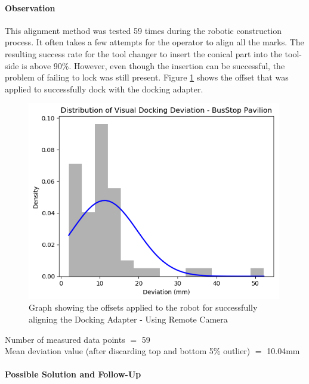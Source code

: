 \paragraph{Observation}

This alignment method was tested 59 times during the robotic construction process.  It often takes a few attempts for the operator to align all the marks. The resulting success rate for the tool changer to insert the conical part into the tool-side is above 90\%. However, even though the insertion can be successful, the problem of failing to lock was still present. Figure \ref{fig:remote-camera-offset} shows the offset that was applied to successfully dock with the docking adapter.

\begin{figure}[!h]
    \centering
    \includegraphics[width=0.99\textwidth]{images/6b/img12.png}
    \caption{Graph showing the offsets applied to the robot for successfully aligning the Docking Adapter - Using Remote Camera}
    \label{fig:remote-camera-offset}
\end{figure}


{\footnotesize Number of measured data points $=$ 59 \\ Mean deviation value (after discarding top and bottom 5\% outlier) $=$ 10.04mm\par}

\paragraph{Possible Solution and Follow-Up}

